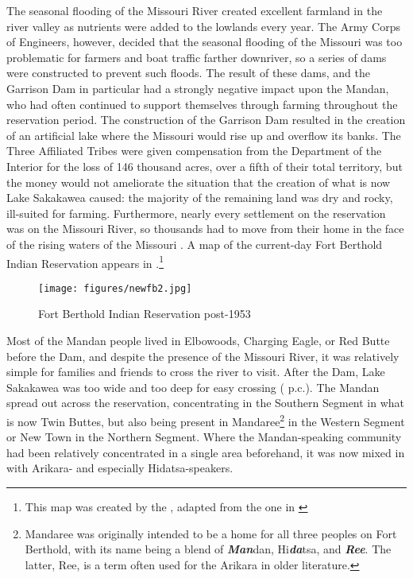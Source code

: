 The seasonal flooding of the Missouri River created excellent farmland in the river valley as nutrients were added to the lowlands every year. The Army Corps of Engineers, however, decided that the seasonal flooding of the Missouri was too problematic for farmers and boat traffic farther downriver, so a series of dams were constructed to prevent such floods. The result of these dams, and the Garrison Dam in particular had a strongly negative impact upon the Mandan, who had often continued to support themselves through farming throughout the reservation period. The construction of the Garrison Dam resulted in the creation of an artificial lake where the Missouri would rise up and overflow its banks. The Three Affiliated Tribes were given compensation from the Department of the Interior for the loss of 146 thousand acres, over a fifth of their total territory, but the money would not ameliorate the situation that the creation of what is now Lake Sakakawea caused: the majority of the remaining land was dry and rocky, ill-suited for farming. Furthermore, nearly every settlement on the reservation was on the Missouri River, so thousands had to move from their home in the face of the rising waters of the Missouri \citep{harper1948}. A map of the current-day Fort Berthold Indian Reservation appears in .\footnote{This map was created by the \citet{northdakota}, adapted from the one in \citet[239]{meyer1977}}

\begin{figure}
\caption{Fort Berthold Indian Reservation post-1953}
\label{newfb}
\texttt{[image: figures/newfb2.jpg]}
\end{figure}

Most of the Mandan people lived in Elbowoods, Charging Eagle, or Red Butte before the Dam, and despite the presence of the Missouri River, it was relatively simple for families and friends to cross the river to visit. After the Dam, Lake Sakakawea was too wide and too deep for easy crossing (\citeauthor{benson2000} p.c.). The Mandan spread out across the reservation, concentrating in the Southern Segment in what is now Twin Buttes, but also being present in Mandaree\footnote{Mandaree was originally intended to be a home for all three peoples on Fort Berthold, with its name being a blend of \textbf{\textit{Man}}dan, Hi\textbf{\textit{da}}tsa, and \textbf{\textit{Ree}}. The latter, Ree, is a term often used for the Arikara in older literature.} in the Western Segment or New Town in the Northern Segment. Where the Mandan-speaking community had been relatively concentrated in a single area beforehand, it was now mixed in with Arikara- and especially Hidatsa-speakers. 

